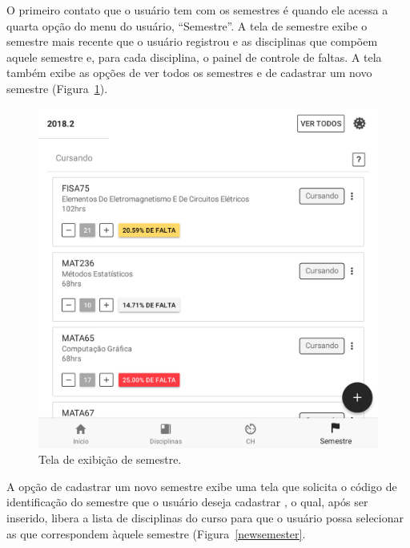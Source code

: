 O primeiro contato que o usuário tem com os semestres é quando ele acessa a quarta opção do menu do usuário, ``Semestre''. A tela de semestre exibe o semestre mais recente que o usuário registrou e as disciplinas que compõem aquele semestre e, para cada disciplina, o painel de controle de faltas. A tela também exibe as opções de ver todos os semestres e de cadastrar um novo semestre (Figura~\ref{semester}).
\begin{figure}[H]
	   \centering
	   		\includegraphics[scale=0.25]{pics/c3/10-semester.png}
	   \caption{Tela de exibição de semestre.}
	   \label{semester}
\end{figure}

A opção de cadastrar um novo semestre exibe uma tela que solicita o código de identificação do semestre que o usuário deseja cadastrar , o qual, após ser inserido, libera a lista de disciplinas do curso para que o usuário possa selecionar as que correspondem àquele semestre (Figura~\ref{newsemester}.

